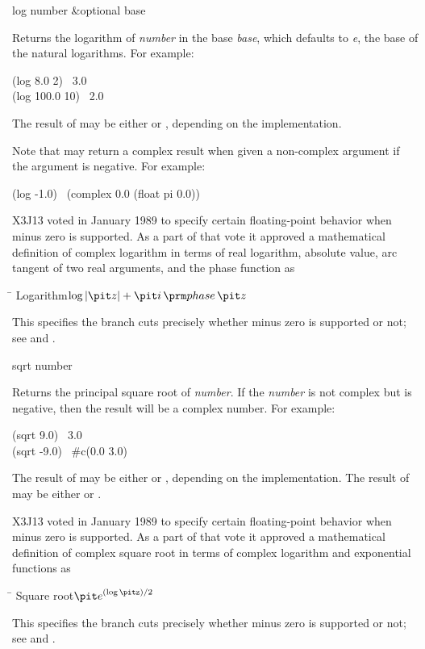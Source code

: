 \begin{defun}[Function]
log number &optional base

Returns the logarithm of {\it number} in the base {\it base},
which defaults to {\it e}, the base of the natural logarithms.
For example:
\begin{lisp}
(log 8.0 2) \EV\ 3.0 \\
(log 100.0 10) \EV\ 2.0
\end{lisp}
The result of  may be either  or , depending on the
implementation.

Note that  may return a complex result when given a non-complex
argument if the argument is negative.  For example:
\begin{lisp}
(log -1.0) \EQ\ (complex 0.0 (float pi 0.0))
\end{lisp}

\begin{new}
X3J13 voted in January 1989
to specify certain floating-point behavior when minus zero is supported.
As a part of that vote it approved a mathematical definition of complex logarithm
in terms of real logarithm, absolute value,
arc tangent of two real arguments, and the phase function as
\begin{tabbing}
\hskip 10pc\=\kill
Logarithm\>$ \log \left| {\it z} \right| + {\it i} \phase {\it z} $
\end{tabbing}
This specifies the branch cuts precisely whether minus zero is supported or not;
see  and .
\end{new}
\end{defun}

\begin{defun}[Function]
sqrt number

Returns the principal square root of {\it number}.
If the {\it number} is not complex but is negative, then the result
will be a complex number.
For example:
\begin{lisp}
(sqrt 9.0) \EV\ 3.0 \\
(sqrt -9.0) \EV\ \#c(0.0 3.0)
\end{lisp}
The result of  may be either  or , depending on the
implementation.  The result of  may be either 
or .

\begin{new}
X3J13 voted in January 1989
to specify certain floating-point behavior when minus zero is supported.
As a part of that vote it approved a mathematical definition of complex square root
in terms of complex logarithm and exponential functions as
\begin{tabbing}
\hskip 10pc\=\kill
Square root\>$ {\it e}^{(\log \hbox{\scriptsize\it z})/2} $
\end{tabbing}
This specifies the branch cuts precisely whether minus zero is supported or not;
see  and .
\end{new}
\end{defun}

